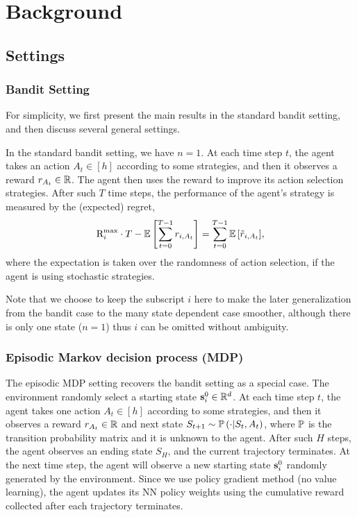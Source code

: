 \section{Background}

\subsection{Settings}

\subsubsection{Bandit Setting}

For simplicity, we first present the main results in the standard bandit setting, and then discuss several general settings.

In the standard bandit setting, we have $n = 1$. At each time step $t$, the agent takes an action $A_t \in [h]$ according to some strategies, and then it observes a reward $r_{A_t} \in {\mathbb{R}}$. The agent then uses the reward to improve its action selection strategies. After such $T$ time steps, the performance of the agent's strategy is measured by the (expected) regret,
\begin{equation}
\label{eq:expected_regret}
    {\text{R}}_i^{\max} \cdot T - {\mathbb{E}} \left[ \sum\limits_{t=0}^{T-1}{  r_{i, A_t}  } \right] = \sum\limits_{t=0}^{T-1}{ {\mathbb{E}} \left[ \tilde{r}_{i, A_t} \right] },
\end{equation}
where the expectation is taken over the randomness of action selection, if the agent is using stochastic strategies.

Note that we choose to keep the subscript $i$ here to make the later generalization from the bandit case to the many state dependent case smoother, although there is only one state ($n = 1$) thus $i$ can be omitted without ambiguity.

\subsubsection{Episodic Markov decision process (MDP)}

The episodic MDP setting recovers the bandit setting as a special case. The environment randomly select a starting state ${\mathbf{s}}_i^0 \in {\mathbb{R}}^d$. At each time step $t$, the agent takes one action $A_t \in [h]$ according to some strategies, and then it observes a reward $r_{A_t} \in {\mathbb{R}}$ and next state $S_{t+1} \sim {\mathbb{P}}\left( \cdot \middle| S_t, A_t \right)$, where ${\mathbb{P}}$ is the transition probability matrix and it is unknown to the agent. After such $H$ steps, the agent observes an ending state $S_H$, and the current trajectory terminates. At the next time step, the agent will observe a new starting state ${\mathbf{s}}_i^0$ randomly generated by the environment. Since we use policy gradient method (no value learning), the agent updates its NN policy weights using the cumulative reward collected after each trajectory terminates.

